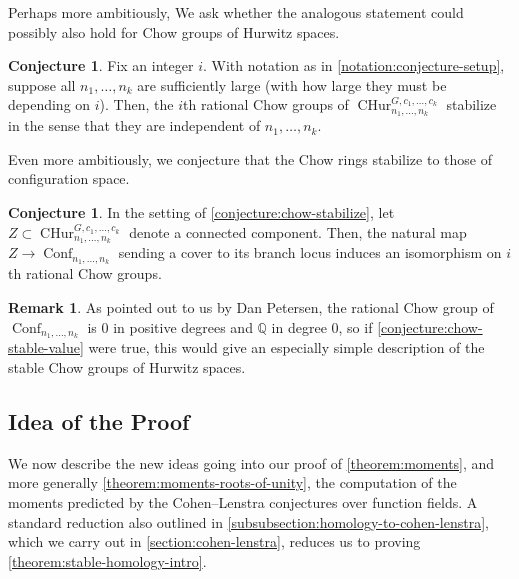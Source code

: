\documentclass[12 pt]{amsart}
\theoremstyle{plain}
\theoremstyle{definition}
\newtheorem{remark}[theorem]{Remark}
\newtheorem{conjecture}[theorem]{Conjecture}
\theoremstyle{remark}
\numberwithin{equation}{section}
\DeclareMathOperator\conf{Conf}
\newcommand{\cphurc}[3]{\operatorname{CHur}^{#1, #3}_{#2}}
\begin{document}
Perhaps more ambitiously,
We ask whether the analogous statement could possibly also hold for 
Chow groups of Hurwitz spaces.
\begin{conjecture}
	\label{conjecture:chow-stabilize}
	Fix an integer $i$. With notation as in
	\autoref{notation:conjecture-setup}, suppose
	all $n_1, \ldots, n_k$ are sufficiently large (with how large they must
	be depending on $i$).
	Then, the $i$th rational Chow groups of 
	$\cphurc G {n_1, \ldots, n_k} {c_1,\ldots, c_k} $ stabilize in the sense
	that they are independent of
	$n_1, \ldots, n_k$.
\end{conjecture}
Even more ambitiously, we conjecture that the Chow rings stabilize to those of
configuration space.
\begin{conjecture}
\label{conjecture:chow-stable-value}
In the setting of \autoref{conjecture:chow-stabilize},
let $Z \subset \cphurc G {n_1, \ldots, n_k} {c_1,\ldots, c_k}$ denote
	a connected component.
	Then, the natural map $Z \to \conf_{n_1, \ldots,
	n_k}$ sending a cover to its branch locus
	induces an isomorphism on $i$th rational Chow groups.
\end{conjecture}

\begin{remark}
	\label{remark:}
	As pointed out to us by Dan Petersen,
	the rational Chow group of 
	$\conf_{n_1, \ldots, n_k}$
	is $0$ in positive degrees and $\mathbb Q$ in degree $0$,
	so if \autoref{conjecture:chow-stable-value} were true,
	this would give an especially simple description of the stable Chow
	groups of Hurwitz spaces.
\end{remark}



\subsection{Idea of the Proof}
\label{subsection:proof-outline}

We now describe the new ideas going into our proof of \autoref{theorem:moments},
and more generally \autoref{theorem:moments-roots-of-unity},
the computation of the moments
predicted by the Cohen--Lenstra conjectures over function fields.
A standard reduction also outlined in
\autoref{subsubsection:homology-to-cohen-lenstra}, which we carry out in
\autoref{section:cohen-lenstra},
reduces us to proving
\autoref{theorem:stable-homology-intro}.
\end{document}
